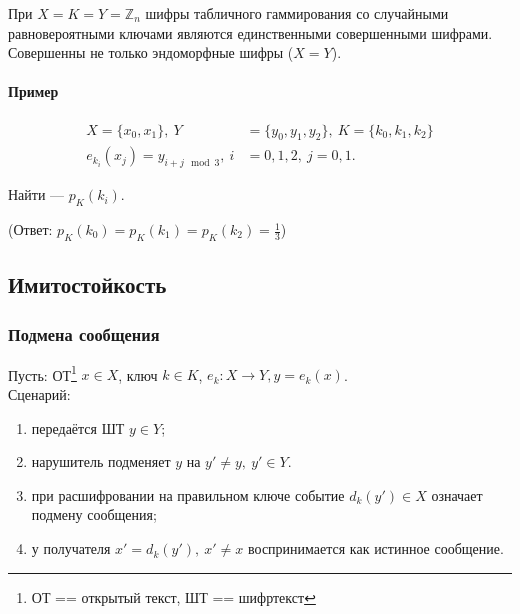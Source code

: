 \documentclass[a4paper,12pt]{article}
\begin{document}
При $X = K = Y = \mathbb{Z}_n$ шифры табличного гаммирования со случайными равновероятными ключами являются единственными совершенными шифрами.\\

Совершенны не только эндоморфные шифры ($X =Y$).

\paragraph{Пример}

$$\begin{aligned}
	X = \{x_0, x_1\}, ~ Y &= \{y_0,y_1,y_2\}, ~ K= \{k_0, k_1, k_2\} \\
	e_{k_i}(x_j) = y_{i + j \mod 3}, ~i &= 0,1,2,~ j=0,1.	
\end{aligned}$$

Найти --- $p_K(k_i)$.

(Ответ: $p_K(k_0) = p_K(k_1) = p_K(k_2) = \frac{1}{3}$)

\subsection{Имитостойкость}



\subsubsection{Подмена сообщения}
Пусть: ОТ\footnote{ОТ == открытый текст, ШТ == шифртекст} $x \in X$, ключ $k \in K$, $e_k: X\rightarrow Y, y = e_k(x)$. \\

Сценарий:
\begin{enumerate}
	\item передаётся ШТ $y\in Y$;
	\item нарушитель подменяет $y$ на $y' \ne y,~ y' \in Y.$
	\item при расшифровании на правильном ключе событие $d_k(y') \in X$ означает подмену сообщения;
	\item у получателя $x' = d_k(y'), ~ x'\ne x$ воспринимается как истинное сообщение.
\end{enumerate}
\end{document}
